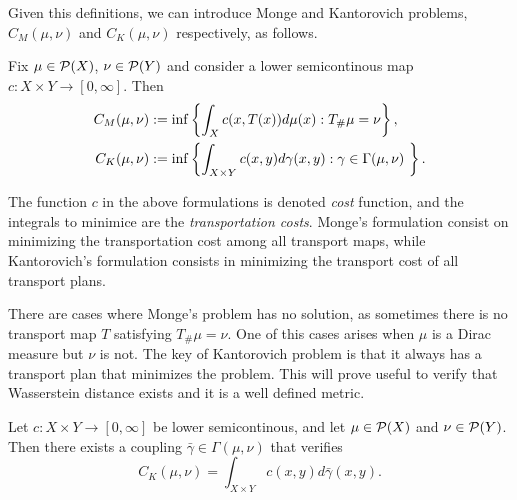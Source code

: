 Given this definitions, we can introduce Monge and Kantorovich problems, $ C_M(\mu, \nu) $ and $ C_K(\mu, \nu) $ respectively, as follows.

\begin{definition}
    Fix $ \mu \in \mathcal P(X)$, $\nu \in \mathcal P(Y)$ and consider a lower semicontinous map $ c: X \times Y \to [0, \infty] $. Then
\begin{align*}
    C_M(\mu, \nu) &:= \inf \left\{\int_X c(x, T(x)) d\mu(x) : T_\#\mu = \nu \right\}, \\
    C_K(\mu, \nu) &:= \inf \left\{\int_{X \times Y} c(x, y) d\gamma(x,y) : \gamma \in \Gamma(\mu, \nu) \ \right\}.
\end{align*}
\end{definition}

The function $ c $ in the above formulations is denoted {\it cost} function, and the integrals to minimice are the {\it transportation costs}. Monge's formulation consist on minimizing the transportation cost among all transport maps, while Kantorovich's formulation consists in minimizing the transport cost of all transport plans.

There are cases where Monge's problem has no solution, as sometimes there is no transport map $ T $ satisfying $ T_\# \mu = \nu $. One of this cases arises when $ \mu $ is a Dirac measure but $ \nu $ is not. The key of Kantorovich problem is that it always has a transport plan that minimizes the problem. This will prove useful to verify that Wasserstein distance exists and it is a well defined metric.



\begin{theorem} \label{thm:existence}
    Let $ c: X \times Y \to [0, \infty] $ be lower semicontinous, and let $ \mu \in \mathcal P(X) $ and $ \nu \in \mathcal P(Y) $. Then there exists a coupling $ \bar \gamma \in \Gamma(\mu, \nu) $ that verifies
    $$
    C_K(\mu, \nu) = \int_{X \times Y} c(x, y) d \bar \gamma(x,y).
    $$
\end{theorem}

